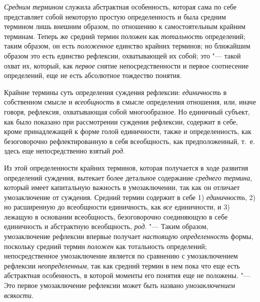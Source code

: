 {\em Средним термином}
служила абстрактная особенность, которая сама по себе
представляет собой некоторую простую определенность и была средним термином
лишь внешним образом, по отношению к самостоятельным крайним терминам.
Теперь же средний термин положен как
{\em тотальность}
определений; таким образом, он есть
{\em положенное} единство
крайних терминов; но ближайшим образом это есть единство рефлексии,
охватывающей их собой; это "--- такой охват их, который, как
{\em первое} снятие
непосредственности и первое соотнесение определений, еще не есть абсолютное
тождество понятия.

Крайние термины суть определения суждения рефлексии:
{\em единичность} в
собственном смысле и {\em всеобщность}
в смысле определения отношения, или, иначе говоря, рефлексия,
охватывающая собой многообразное. Но единичный субъект, как было показано
при рассмотрении суждения рефлексии, содержит в себе, кроме принадлежащей к
форме голой единичности, также и определенность, как безоговорочно
рефлектированную в себя всеобщность, как предположенный, т.~е. здесь еще
непосредственно взятый {\em род}.

Из этой определенности крайних терминов, которая получается в
ходе развития определений суждения, вытекает более детальное содержание
{\em среднего термина},
который имеет капитальную важность в умозаключении, так как
он отличает умозаключение от суждения. Средний термин содержит в себе 1)
{\em единичность}, 2) но
расширенную до всеобщности единичность, как
{\em все} единичности, и
3) лежащую в основании всеобщность, безоговорочно соединяющую в себе
единичность и абстрактную всеобщность,
{\em род}. "--- Таким
образом, умозаключение рефлексии впервые получает
{\em настоящую определенность}
формы, поскольку средний термин
{\em положен} как
тотальность определений; непосредственное умозаключение является
по сравнению с умозаключением рефлексии
{\em неопределенным}, так
как средний термин в нем пока что еще есть абстрактная особенность, в
которой моменты его понятия еще не положены. "--- Это первое
умозаключение рефлексии может быть названо
{\em умозаключением
всякости}.

